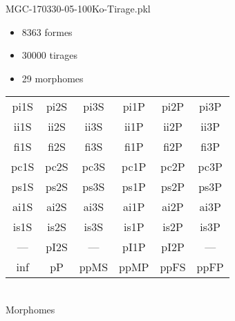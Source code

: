 MGC-170330-05-100Ko-Tirage.pkl
\begin{itemize}
\item 8363 formes
\item 30000 tirages
\item 29 morphomes
\end{itemize}
\begin{center}
\begin{tabular}{cccccc}
\hline
\cellcolor{white}pi1S & \cellcolor{orange}pi2S & \cellcolor{orange}pi3S & \cellcolor{white}pi1P & \cellcolor{white}pi2P & \cellcolor{white}pi3P\\
\cellcolor{brown}ii1S & \cellcolor{brown}ii2S & \cellcolor{brown}ii3S & \cellcolor{white}ii1P & \cellcolor{white}ii2P & \cellcolor{brown}ii3P\\
\cellcolor{yellow}fi1S & \cellcolor{lime}fi2S & \cellcolor{lime}fi3S & \cellcolor{green}fi1P & \cellcolor{white}fi2P & \cellcolor{green}fi3P\\
\cellcolor{yellow}pc1S & \cellcolor{yellow}pc2S & \cellcolor{yellow}pc3S & \cellcolor{white}pc1P & \cellcolor{white}pc2P & \cellcolor{yellow}pc3P\\
\cellcolor{teal}ps1S & \cellcolor{white}ps2S & \cellcolor{teal}ps3S & \cellcolor{white}ps1P & \cellcolor{blue}ps2P & \cellcolor{teal}ps3P\\
\cellcolor{white}ai1S & \cellcolor{lightgray}ai2S & \cellcolor{lightgray}ai3S & \cellcolor{blue}ai1P & \cellcolor{pink}ai2P & \cellcolor{white}ai3P\\
\cellcolor{black}is1S & \cellcolor{black}is2S & \cellcolor{lightgray}is3S & \cellcolor{black}is1P & \cellcolor{black}is2P & \cellcolor{pink}is3P\\
--- & \cellcolor{white}pI2S & --- & \cellcolor{white}pI1P & \cellcolor{white}pI2P & ---\\
\cellcolor{white}inf & \cellcolor{white}pP & \cellcolor{white}ppMS & \cellcolor{white}ppMP & \cellcolor{pink}ppFS & \cellcolor{pink}ppFP\\
\hline
\end{tabular}\\
Morphomes
\end{center}
\bigskip

